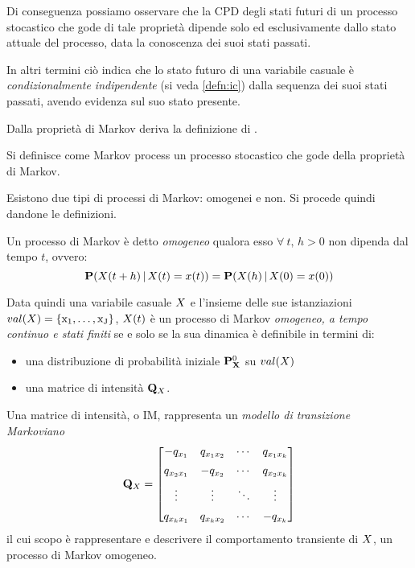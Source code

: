 Di conseguenza possiamo osservare che la \acl{CPD} degli stati futuri di un processo stocastico che gode di tale proprietà dipende solo ed esclusivamente dallo stato attuale del processo, data la conoscenza dei suoi stati passati.

In altri termini ciò indica che lo stato futuro di una variabile casuale è \emph{condizionalmente indipendente} (si veda \ref{defn:ic}) dalla sequenza dei suoi stati passati, avendo evidenza sul suo stato presente.

Dalla proprietà di Markov deriva la definizione di \mprocess{}.

\begin{definizione}[\mprocess{}]
Si definisce come Markov process un processo stocastico che gode della proprietà di Markov.
\end{definizione}

Esistono due tipi di processi di Markov: omogenei e non. Si procede quindi dandone le definizioni.

\begin{definizione}[\homm\mprocess]
\label{defn:homogeneus-markov-process}
Un processo di Markov è detto \emph{omogeneo} qualora esso $\forall\:t,\,h > 0$ non dipenda dal tempo $t$, ovvero:
\begin{equation}
\label{eq:homogeneus-markov-process}
\mathbf{P}(\mathnormal{X}(t + h)\,|\,\mathnormal{X}(t)=x(t))=\mathbf{P}(\mathnormal{X}(h)\,|\,\mathnormal{X}(0)=x(0))
\end{equation}
\end{definizione}
Data quindi una variabile casuale $\mathnormal{X}$ e l'insieme delle sue istanziazioni $val(\mathnormal{X})=\{ \mathrm{x_1}, \dotsc, \mathrm{x_J} \}$, $\mathnormal{X}(t)$ è un processo di Markov \emph{omogeneo, a tempo continuo e stati finiti} se e solo se la sua dinamica è definibile in termini di:
\begin{itemize}
    \item una distribuzione di probabilità iniziale $\mathbf{P}^0_{\mathbf{X}}$ su $val(\mathnormal{X})$
    \item una matrice di intensità $\mathbf{Q}_{\mathnormal{X}}$.
\end{itemize}

\begin{definizione}
\label{defn:im}
Una matrice di intensità, o \acf{IM}, rappresenta un \emph{modello di transizione Markoviano}
\[
\mathbf{Q}_{\mathnormal{X}}= \begin{bmatrix}
                        -q_{x_1}    & q_{x_1x_2}& \cdots & q_{x_1x_k}   \\[0.5em]
                        q_{x_2x_1}  & -q_{x_2}  & \cdots & q_{x_2x_k}   \\[0.5em]
                        \vdots      & \vdots    & \ddots & \vdots       \\[0.5em]
                        q_{x_kx_1}  & q_{x_kx_2}& \cdots & -q_{x_k}
                    \end{bmatrix}
\]
il cui scopo è rappresentare e descrivere il comportamento transiente di $\mathnormal{X}$, un processo di Markov omogeneo.
\end{definizione}

